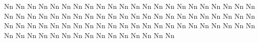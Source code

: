 \documentclass{worksheet}
\begin{document}
\begin{drillsheet}
\calligra
Nn Nn Nn Nn Nn Nn Nn Nn Nn Nn Nn Nn Nn Nn Nn Nn Nn Nn Nn Nn Nn Nn Nn Nn Nn Nn Nn Nn Nn Nn Nn Nn Nn Nn Nn Nn Nn Nn Nn Nn Nn Nn Nn Nn Nn Nn Nn Nn Nn Nn Nn Nn Nn Nn Nn Nn Nn Nn Nn Nn Nn Nn Nn Nn Nn Nn Nn Nn Nn Nn Nn Nn Nn Nn Nn Nn Nn Nn Nn Nn Nn
\end{drillsheet}
\end{document}
